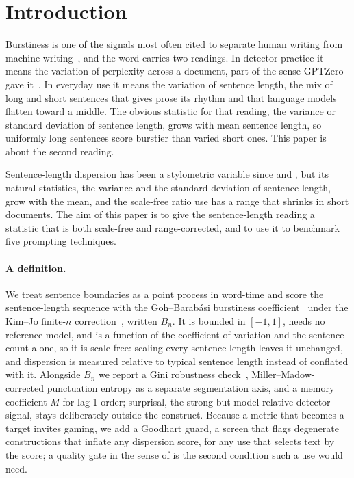 \documentclass{article}
\begin{document}
\section{Introduction}

Burstiness is one of the signals most often cited to separate human writing
from machine writing~\citep{arxiv2024detecting}, and the word carries two
readings. In detector practice it means the variation of perplexity across a
document, part of the sense GPTZero gave it~\citep{gptzero2023burstiness}. In everyday
use it means the variation of sentence length, the mix of long and short
sentences that gives prose its rhythm and that language models flatten toward a
middle. The obvious statistic for that reading, the variance or standard
deviation of sentence length, grows with mean sentence length, so uniformly long
sentences score burstier than varied short ones. This paper is about the second
reading.

Sentence-length dispersion has been a stylometric variable since
\citet{yule1939sentence} and \citet{williams1940note}, but its natural statistics, the
variance and the standard deviation of sentence length, grow with the mean, and
the scale-free ratio \citet{onan2025you} use has a range that shrinks in short
documents. The aim of this paper is to give the sentence-length
reading a statistic that is both scale-free and range-corrected, and to use it to
benchmark five prompting techniques.

\paragraph{A definition.}
We treat sentence boundaries as a point process in word-time and score the
sentence-length sequence with the Goh--Barab\'asi burstiness
coefficient~\citep{goh2008burstiness} under the Kim--Jo finite-$n$
correction~\citep{kim2016measuring}, written $B_n$. It is bounded in
$[-1, 1]$, needs no reference model, and is a function of the coefficient of
variation and the sentence count alone, so it is scale-free: scaling every
sentence length leaves it unchanged, and dispersion is measured relative to
typical sentence length instead of conflated with it. Alongside $B_n$ we report a
Gini robustness check~\citep{gini1912variabilit}, Miller--Madow-corrected
punctuation entropy as a separate segmentation axis, and a memory coefficient
$M$ for lag-1 order; surprisal, the strong but model-relative detector
signal, stays deliberately outside the construct. Because a metric that
becomes a target invites gaming, we add a Goodhart guard, a screen that flags
degenerate constructions that inflate any dispersion score, for any use that
selects text by the score; a quality gate in the sense of
\citet{arxiv2025evaluating} is the second condition such a use would need.
\end{document}

